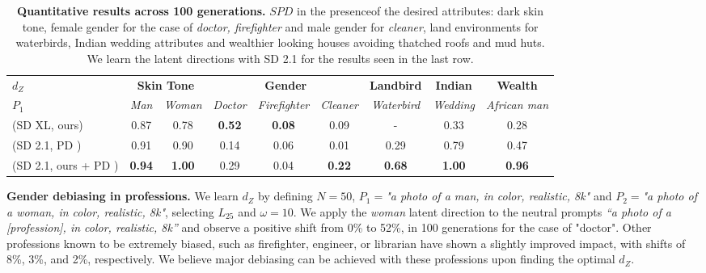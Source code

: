 
\begin{table}[ht!]
  \centering
    \begin{tabular}{l|cc|ccc|c|c|c}
        \hline
        $d_{Z}$ & \multicolumn{2}{c|}{\textbf{Skin Tone}} & \multicolumn{3}{c|}{\textbf{Gender}} & \textbf{Landbird} & \textbf{Indian} & \textbf{Wealth}\\
        \textit{$P_{1}$} & \textit{Man} & \textit{Woman} & \textit{Doctor} & \textit{Firefighter} & \textit{Cleaner} & \textit{Waterbird}  & \textit{Wedding} & \textit{African man}\\
        \hline 
         (SD XL, ours) & 0.87 & 0.78 & \textbf{0.52} & \textbf{0.08} & 0.09 & - & 0.33 & 0.28\\
        (SD 2.1, PD \cite{chuang2023debiasing})  & 0.91 & 0.90 & 0.14 & 0.06 & 0.01 & 0.29 & 0.79& 0.47\\
        (SD 2.1, ours + PD \cite{chuang2023debiasing}) & \textbf{0.94} & \textbf{1.00} & 0.29 & 0.04 & \textbf{0.22} & \textbf{0.68} & \textbf{1.00} & \textbf{0.96}\\
        \hline
    \end{tabular}
    \caption{\textbf{Quantitative results across 100 generations.} $SPD$ in the presence\protect\footnotemark of the desired attributes: dark skin tone, female gender for the case of \textit{doctor, firefighter} and male gender for \textit{cleaner}, land environments for waterbirds, Indian wedding attributes and wealthier looking houses avoiding thatched roofs and mud huts. We learn the latent directions with SD 2.1 for the results seen in the last row.}
    \label{table_quantitative_results}
\end{table}

\noindent\textbf{Gender debiasing in professions.} We learn $d_{Z}$ by defining $N=50$, $P_{1}=$\textit{"a photo of a man, in color, realistic, 8k"} and $P_{2}=$\textit{"a photo of a woman, in color, realistic, 8k"}, selecting $L_{25}$ and $\omega=10$. We apply the \textit{woman} latent direction to the neutral prompts \textit{“a photo of a [profession], in color, realistic, 8k”} and observe a positive shift from 0\% to 52\%, in 100 generations for the case of "doctor". Other professions known to be extremely biased, such as firefighter, engineer, or librarian have shown a slightly improved impact, with shifts of 8\%, 3\%, and 2\%, respectively. We believe major debiasing can be achieved with these professions upon finding the optimal $d_{Z}$.


